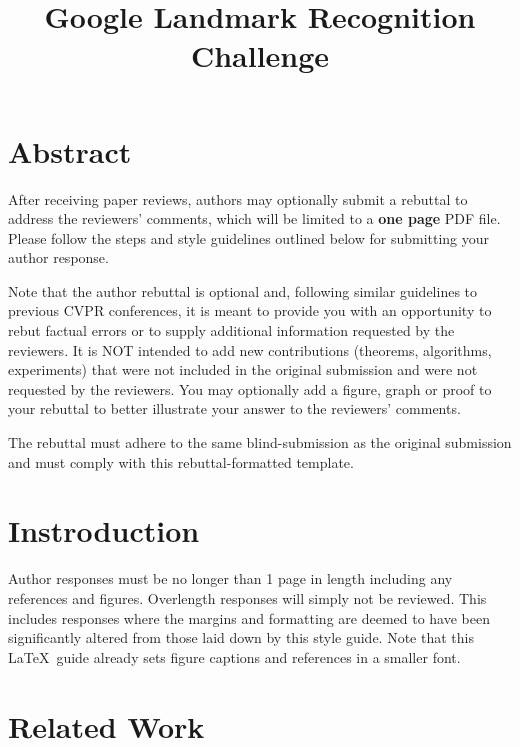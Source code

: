 \documentclass[10pt,twocolumn,letterpaper]{article}
\begin{document}
\title{Google Landmark Recognition Challenge}  %

\maketitle
\thispagestyle{empty}


\section{Abstract}

After receiving paper reviews, authors may optionally submit a rebuttal to address the reviewers' comments, which will be limited to a {\bf one page} PDF file.  Please follow the steps and style guidelines outlined below for submitting your author response.

Note that the author rebuttal is optional and, following similar guidelines to previous CVPR conferences, it is meant to provide you with an opportunity to rebut factual errors or to supply additional information requested by the reviewers. It is NOT intended to add new contributions (theorems, algorithms, experiments) that were not included in the original submission and were not requested by the reviewers. You may optionally add a figure, graph or proof to your rebuttal to better illustrate your answer to the reviewers' comments.

The rebuttal must adhere to the same blind-submission as the original submission and must comply with this rebuttal-formatted template.


\section{Instroduction}
Author responses must be no longer than 1 page in length including any references and figures.  Overlength responses will simply not be reviewed.  This includes responses where the margins and formatting are deemed to have been significantly altered from those laid down by this style guide.  Note that this \LaTeX\ guide already sets figure captions and references in a smaller font.

\section{Related Work}
\end{document}
